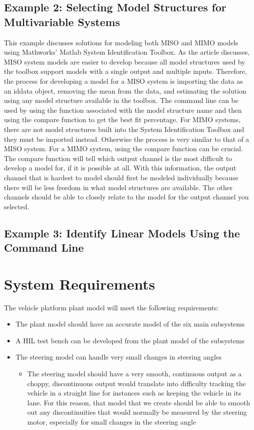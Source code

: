\documentclass[letterpaper,12pt]{article}   %
\begin{document}
\subsection{Example 2: Selecting Model Structures for Multivariable Systems}
\label{sec:sysID-Example2}
This example discusses solutions for modeling both MISO and MIMO models using Mathworks' Matlab System Identification Toolbox. As the article discusses, MISO system models are easier to develop because all model structures used by the toolbox support models with a single output and multiple inputs. Therefore, the process for developing a model for a MISO system is importing the data as an iddata object, removing the mean from the data, and estimating the solution using any model structure available in the toolbox. The command line can be used by using the function associated with the model structure name and then using the compare function to get the best fit percentage. For MIMO systems, there are not model structures built into the System Identification Toolbox and they must be imported instead. Otherwise the process is very similar to that of a MISO system. For a MIMO system, using the compare function can be crucial. The compare function will tell which output channel is the most difficult to develop a model for, if it is possible at all. With this information, the output channel that is hardest to model should first be modeled individually because there will be less freedom in what model structures are available. The other channels should be able to closely relate to the model for the output channel you selected.


\subsection{Example 3: Identify Linear Models Using the Command Line}
\label{sec:sysID-Example3}



\section{System Requirements}
The vehicle platform plant model will meet the following requirements:
\begin{itemize}
    \item The plant model should have an accurate model of the six main subsystems
    \item A HIL test bench can be developed from the plant model of the subsystems
    \item The steering model can handle very small changes in steering angles
    \begin{itemize}
    		\item The steering model should have a very smooth, continuous output as a choppy, discontinuous output would translate into difficulty tracking the vehicle in a straight line for instances such as keeping the vehicle in its lane. For this reason, that model that we create should be able to smooth out any discontinuities that would normally be measured by the steering motor, especially for small changes in the steering angle
    \end{itemize}
\end{itemize}
\end{document}
